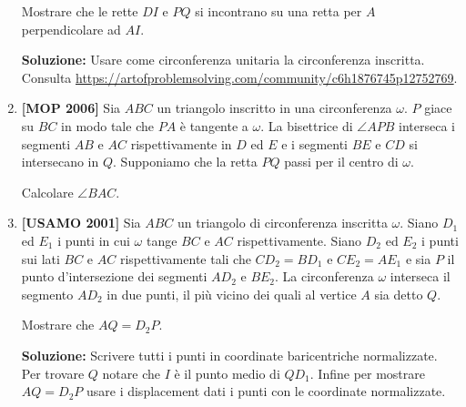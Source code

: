 \begin{enumerate}
	Mostrare che le rette $DI$ e $PQ$ si incontrano su una retta per $A$ perpendicolare ad $AI$.
	
	\textbf{Soluzione:} Usare come circonferenza unitaria la circonferenza inscritta. Consulta \url{https://artofproblemsolving.com/community/c6h1876745p12752769}.
	
	\item \textbf{[MOP 2006]} Sia $ABC$ un triangolo inscritto in una circonferenza $\omega$. $P$ giace su $BC$ in modo tale che $PA$ è tangente a $\omega$. La bisettrice di $\angle APB$ interseca i segmenti $AB$ e $AC$ rispettivamente in $D$ ed $E$ e i segmenti $BE$ e $CD$ si intersecano in $Q$. Supponiamo che la retta $PQ$ passi per il centro di $\omega$. 
	
	Calcolare $\angle BAC$.
	
	\item \textbf{[USAMO 2001]} Sia $ABC$ un triangolo di circonferenza inscritta $\omega$. Siano $D_1$ ed $E_1$ i punti in cui $\omega$ tange $BC$ e $AC$ rispettivamente. Siano $D_2$ ed $E_2$ i punti sui lati $BC$ e $AC$ rispettivamente tali che $CD_2=BD_1$ e $CE_2=AE_1$ e sia $P$ il punto d'intersezione dei segmenti $AD_2$ e $BE_2$. La circonferenza $\omega$ interseca il segmento $AD_2$ in due punti, il più vicino dei quali al vertice $A$ sia detto $Q$. 
	
	Mostrare che $AQ=D_2P$.
	
	\textbf{Soluzione:} Scrivere tutti i punti in coordinate baricentriche normalizzate. Per trovare $Q$ notare che $I$ è il punto medio di $QD_1$. Infine per mostrare $AQ=D_2P$ usare i displacement dati i punti con le coordinate normalizzate. 
	

\end{enumerate}
\clearpage
